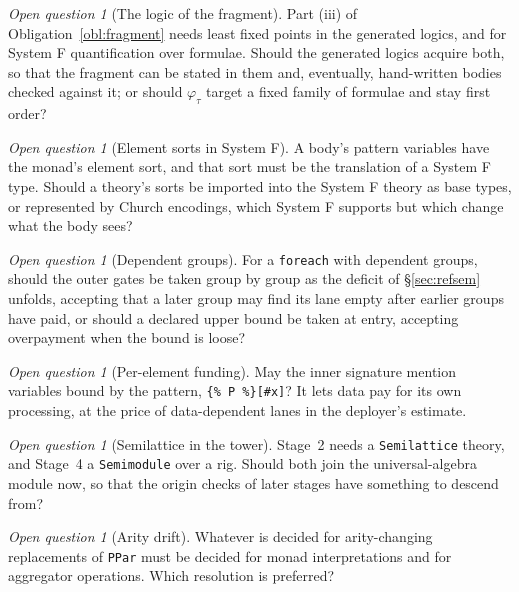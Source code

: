 \documentclass[11pt]{article}
\theoremstyle{definition}
\theoremstyle{plain}
\theoremstyle{remark}
\newtheorem{question}[definition]{Open question}
\newcommand{\fe}{\texttt{foreach}}
\begin{document}
\begin{question}[The logic of the fragment]
\label{q:logic}
Part (iii) of Obligation~\ref{obl:fragment} needs least fixed points in the
generated logics, and for System F quantification over formulae. Should the
generated logics acquire both, so that the fragment can be stated in them and,
eventually, hand-written bodies checked against it; or should \(\varphi_\tau\)
target a fixed family of formulae and stay first order?
\end{question}

\begin{question}[Element sorts in System F]
A body's pattern variables have the monad's element sort, and that sort must be
the translation of a System F type. Should a theory's sorts be imported into the
System F theory as base types, or represented by Church encodings, which System
F supports but which change what the body sees?
\end{question}

\begin{question}[Dependent groups]
\label{q:dependent}
For a \fe{} with dependent groups, should the outer gates be taken group by
group as the deficit of \S\ref{sec:refsem} unfolds, accepting that a later group
may find its lane empty after earlier groups have paid, or should a declared
upper bound be taken at entry, accepting overpayment when the bound is loose?
\end{question}

\begin{question}[Per-element funding]
\label{q:hash}
May the inner signature mention variables bound by the pattern,
\verb|{% P %}[#x]|? It lets data pay for its own processing, at the price of
data-dependent lanes in the deployer's estimate.
\end{question}

\begin{question}[Semilattice in the tower]
Stage~2 needs a \texttt{Semilattice} theory, and Stage~4 a \texttt{Semimodule}
over a rig. Should both join the universal-algebra module now, so that the
origin checks of later stages have something to descend from?
\end{question}

\begin{question}[Arity drift]
Whatever is decided for arity-changing replacements of \texttt{PPar} must be
decided for monad interpretations and for aggregator operations. Which
resolution is preferred?
\end{question}
\end{document}
